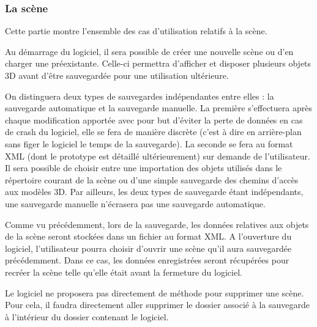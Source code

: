 \subsubsection{La scène}
Cette partie montre l’ensemble des cas d’utilisation relatifs à la scène.

\begin{description}[style=nextline]
    \item[Création de la scène]
    \mbox{\hspace{1cm}} Au démarrage du logiciel, il sera possible de créer une nouvelle scène ou d’en charger une préexistante. Celle-ci permettra d’afficher et disposer plusieurs objets 3D avant d’être sauvegardée pour une utilisation ultérieure.
    
    \item[Sauvegarde de la scène] 
    \mbox{\hspace{1cm}} On distinguera deux types de sauvegardes indépendantes entre elles : la sauvegarde automatique et la sauvegarde manuelle. La première s’effectuera après chaque modification apportée avec pour but d’éviter la perte de données en cas de crash du logiciel, elle se fera de manière discrète (c’est à dire en arrière-plan sans figer le logiciel le temps de la sauvegarde). La seconde se fera au format XML (dont le prototype est détaillé ultérieurement) sur demande de l’utilisateur. Il sera possible de choisir entre une importation des objets utilisés dans le répertoire courant de la scène ou d’une simple sauvegarde des chemins d’accès aux modèles 3D. Par ailleurs, les deux types de sauvegarde étant indépendants, une sauvegarde manuelle n’écrasera pas une sauvegarde automatique.
    
    \item[Chargement de la scène] 
    \mbox{\hspace{1cm}} Comme vu précédemment, lors de la sauvegarde, les données relatives aux objets de la scène seront stockées dans un fichier au format XML. A l’ouverture du logiciel, l’utilisateur pourra choisir d’ouvrir une scène qu’il aura sauvegardée précédemment. Dans ce cas, les données enregistrées seront récupérées pour recréer la scène telle qu’elle était avant la fermeture du logiciel.
    
    \item[Suppression de la scène]
    \mbox{\hspace{1cm}} Le logiciel ne proposera pas directement de méthode pour supprimer une scène. Pour cela, il faudra directement aller supprimer le dossier associé à la sauvegarde à l’intérieur du dossier contenant le logiciel.
    
\end{description}
	
